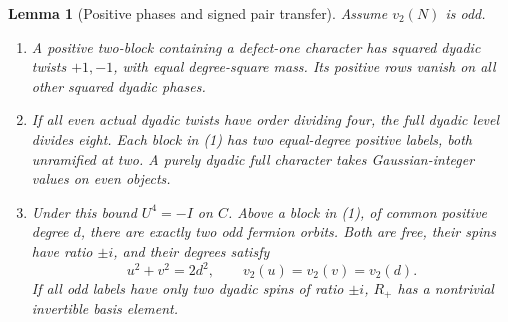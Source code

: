 \documentclass[11pt,a4paper]{article}
\numberwithin{equation}{section}
\newtheorem{lemma}[theorem]{Lemma}
\begin{document}
\begin{lemma}[Positive phases and signed pair transfer]
\label{red:fermion-phase-pair}
Assume $v_2(N)$ is odd.
\begin{enumerate}
\item A positive two-block containing a defect-one character
has squared dyadic twists $+1,-1$, with equal degree-square mass.
Its positive rows vanish on all other squared dyadic phases.
\item If all even actual dyadic twists have order dividing four,
the full dyadic level divides eight. Each block in (1) has two
equal-degree positive labels, both unramified at two. A purely
dyadic full character takes Gaussian-integer values on even objects.
\item Under this bound $U^4=-I$ on $C$. Above a block in
(1), of common positive degree $d$, there are exactly two odd
fermion orbits. Both are free, their spins have ratio $\pm i$,
and their degrees satisfy
\[
       u^2+v^2=2d^2,\qquad v_2(u)=v_2(v)=v_2(d).
\]
If all odd labels have only two dyadic spins of ratio $\pm i$,
$R_+$ has a nontrivial invertible basis element.
\end{enumerate}
\end{lemma}
\end{document}
